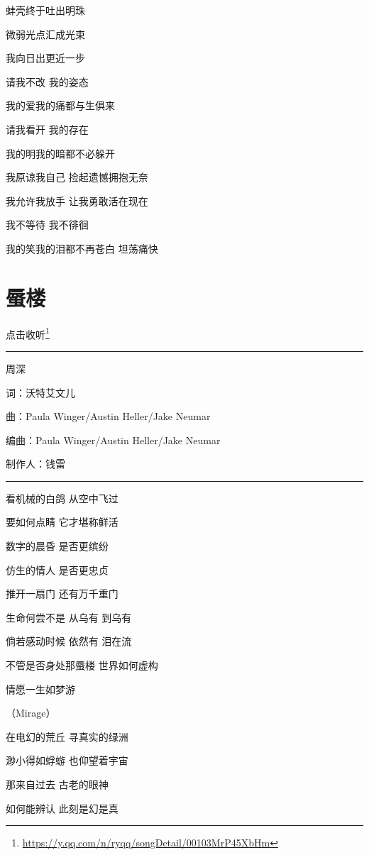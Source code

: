 \documentclass[]{ctexbook}
\renewcommand{\href}[2]{#2\footnote{\url{#1}}}
\begin{document}
蚌壳终于吐出明珠

微弱光点汇成光束

我向日出更近一步

请我不改 我的姿态

我的爱我的痛都与生俱来

请我看开 我的存在

我的明我的暗都不必躲开

我原谅我自己 捡起遗憾拥抱无奈

我允许我放手 让我勇敢活在现在

我不等待 我不徘徊

我的笑我的泪都不再苍白 坦荡痛快

\section*{蜃楼}\label{mirage}


\href{https://y.qq.com/n/ryqq/songDetail/00103MrP45XbHm}{点击收听}

\begin{center}\rule{0.5\linewidth}{0.5pt}\end{center}

周深

词：沃特艾文儿

曲：Paula Winger/Austin Heller/Jake Neumar

编曲：Paula Winger/Austin Heller/Jake Neumar

制作人：钱雷

\begin{center}\rule{0.5\linewidth}{0.5pt}\end{center}

看机械的白鸽 从空中飞过

要如何点睛 它才堪称鲜活

数字的晨昏 是否更缤纷

仿生的情人 是否更忠贞

推开一扇门 还有万千重门

生命何尝不是 从乌有 到乌有

倘若感动时候 依然有 泪在流

不管是否身处那蜃楼 世界如何虚构

情愿一生如梦游

（Mirage）

在电幻的荒丘 寻真实的绿洲

渺小得如蜉蝣 也仰望着宇宙

那来自过去 古老的眼神

如何能辨认 此刻是幻是真
\end{document}
